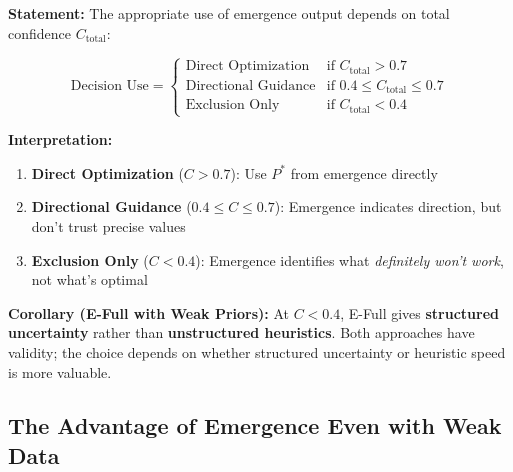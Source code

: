 \begin{tcolorbox}[colback=blue!5!white, colframe=blue!75!black,
    title=\textbf{Theorem IE-T4: Confidence-Weighted Decision Rule}]

\textbf{Statement:} The appropriate use of emergence output depends on total confidence $C_{\text{total}}$:

\begin{equation}
\boxed{
\text{Decision Use} = \begin{cases}
\text{Direct Optimization} & \text{if } C_{\text{total}} > 0.7 \\
\text{Directional Guidance} & \text{if } 0.4 \leq C_{\text{total}} \leq 0.7 \\
\text{Exclusion Only} & \text{if } C_{\text{total}} < 0.4
\end{cases}
}
\label{eq:ie-decision-rule}
\end{equation}

\textbf{Interpretation:}
\begin{enumerate}[nosep]
    \item \textbf{Direct Optimization} ($C > 0.7$): Use $P^*$ from emergence directly
    \item \textbf{Directional Guidance} ($0.4 \leq C \leq 0.7$): Emergence indicates direction, but don't trust precise values
    \item \textbf{Exclusion Only} ($C < 0.4$): Emergence identifies what \textit{definitely won't work}, not what's optimal
\end{enumerate}

\textbf{Corollary (E-Full with Weak Priors):} At $C < 0.4$, E-Full gives \textbf{structured uncertainty} rather than \textbf{unstructured heuristics}. Both approaches have validity; the choice depends on whether structured uncertainty or heuristic speed is more valuable.
\end{tcolorbox}

\subsection{The Advantage of Emergence Even with Weak Data}

